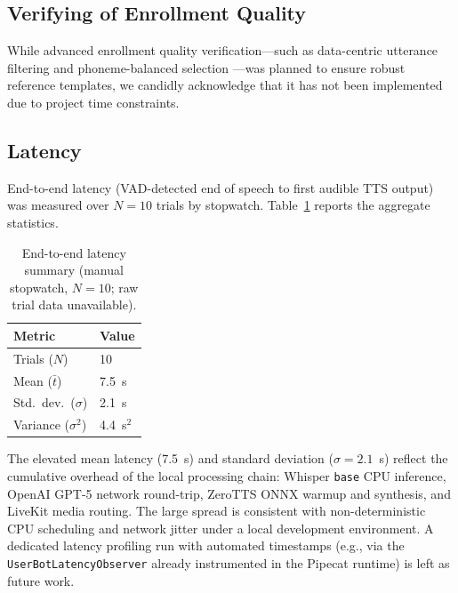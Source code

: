 \subsection{Verifying of Enrollment Quality}

While advanced enrollment quality verification---such as data-centric utterance filtering \cite{le2025datacentric} and phoneme-balanced selection \cite{longquocandnhut}---was planned to ensure robust reference templates, we candidly acknowledge that it has not been implemented due to project time constraints.

\subsection{Latency}

End-to-end latency (VAD-detected end of speech to first audible TTS output) was measured over $N=10$ trials by stopwatch. Table~\ref{tab:latency-summary} reports the aggregate statistics.


\begin{table}[htbp]
\centering\small
\renewcommand{\arraystretch}{1.0}
\begin{tabular}{l p{2cm}}
\toprule
\textbf{Metric} & \textbf{Value} \\
\midrule
Trials ($N$) & 10 \\
Mean ($\bar{t}$) & 7.5~s \\
Std.\ dev.\ ($\sigma$) & 2.1~s \\
Variance ($\sigma^2$) & 4.4~s$^2$ \\
\bottomrule
\end{tabular}
\caption{End-to-end latency summary (manual stopwatch, $N=10$; raw trial data unavailable).}
\label{tab:latency-summary}
\end{table}

The elevated mean latency (7.5~s) and standard deviation ($\sigma = 2.1$~s) reflect the cumulative overhead of the local processing chain: Whisper \texttt{base} CPU inference, OpenAI GPT-5 network round-trip, ZeroTTS ONNX warmup and synthesis, and LiveKit media routing. The large spread is consistent with non-deterministic CPU scheduling and network jitter under a local development environment. A dedicated latency profiling run with automated timestamps (e.g., via the \texttt{UserBotLatencyObserver} already instrumented in the Pipecat runtime) is left as future work.

